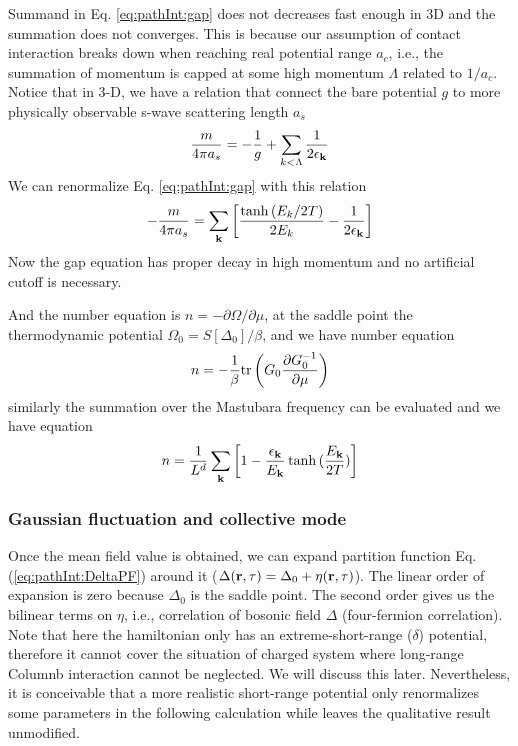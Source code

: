 Summand in Eq. \ref{eq:pathInt:gap} does not decreases fast enough in 3D and the summation does not converges.  This is because our assumption of contact interaction breaks down when reaching real potential range $a_{c}$, i.e., the summation of momentum is capped at some high momentum $\Lambda$ related to $1/a_{c}$.  Notice that in 3-D, we have a relation that connect the bare potential $g$ to more physically observable s-wave scattering length $a_{s}$
\begin{equation}
\frac{m}{4\pi{}a_{s}}=-\frac{1}{g}+\sum_{k<\Lambda}\frac{1}{2\epsilon_{\mathbf{k}}}
\end{equation}
We can renormalize Eq. \ref{eq:pathInt:gap} with this relation
\begin{equation}
-\frac{m}{4\pi{}a_{s}}=\sum_{\mathbf{k}}\left[\frac{\tanh{(E_k/2T)}}{2E_k}-\frac{1}{2\epsilon_{\mathbf{k}}}\right]
\end{equation}
Now the gap equation has proper decay in high momentum and no artificial cutoff is necessary.  

And the number equation is $n=-\partial\Omega/\partial\mu$, at the saddle point the thermodynamic potential $\Omega_{0}=S[\Delta_{0}]/\beta$, and we have number equation
\begin{equation*}
n=-\frac{1}{\beta}\text{tr}\left({G_{0}\frac{\partial{G_{0}^{-1}}}{\partial{\mu}}}\right)
\end{equation*}
similarly the summation over the Mastubara frequency can be evaluated and we have equation
\begin{equation}
n=\frac{1}{L^{d}}\sum_{\mathbf{k}}\left[1-\frac{\epsilon_{\mathbf{k}}}{E_{\mathbf{k}}}\tanh{(\frac{E_{\ensuremath{\mathbf{k}}}}{2T})}\right]
\end{equation}

\subsubsection{Gaussian fluctuation and collective mode}\label{sec:collective1}
Once the mean field value is obtained, we can expand partition function Eq. (\ref{eq:pathInt:DeltaPF}) around it ($\Delta(\mathbf{r},\tau)=\Delta_{0}+\eta(\mathbf{r},\tau)$). The linear order of  expansion is zero because $\Delta_{0}$ is the saddle point.  The second order gives us the bilinear terms on $\eta$, i.e., correlation of bosonic field $\Delta$ (four-fermion correlation).  Note that here the hamiltonian only has an extreme-short-range ($\delta$) potential, therefore it cannot cover the situation of charged system where long-range Columnb interaction cannot be neglected.  We will discuss this later.  Nevertheless, it is conceivable that a more realistic short-range potential only renormalizes some parameters in the following calculation while leaves the qualitative result unmodified.  

